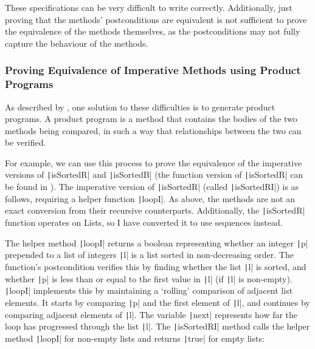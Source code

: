 These specifications can be very difficult to write correctly. Additionally, just proving that the methods' postconditions are equivalent is not sufficient to prove the equivalence of the methods themselves, as the postconditions may not fully capture the behaviour of the methods. 

\subsubsection{Proving Equivalence of Imperative Methods using Product Programs}

As described by \textcite{lahiriDifferentialAssertionChecking2013}, one solution to these difficulties is to generate product programs. A product program is a method that contains the bodies of the two methods being compared, in such a way that relationships between the two can be verified.

For example, we can use this process to prove the equivalence of the imperative versions of \texttt|isSortedR| and \texttt|isSortedB| (the function version of \texttt|isSortedR| can be found in ). The imperative version of \texttt|isSortedR| (called \texttt|isSortedRI|) is as follows, requiring a helper function \texttt|loopI|. As above, the methods are not an exact conversion from their recursive counterparts. Additionally, the \texttt|isSortedR| function operates on Lists, so I have converted it to use sequences instead. 

The helper method \texttt|loopI| returns a boolean representing whether an integer \texttt|p| prepended to a list of integers \texttt|l| is a list sorted in non-decreasing order. The function's postcondition verifies this by finding whether the list \texttt|l| is sorted, and whether \texttt|p| is less than or equal to the first value in \texttt|l| (if \texttt|l| is non-empty). \texttt|loopI| implements this by maintaining a `rolling' comparison of adjacent list elements. It starts by comparing \texttt|p| and the first element of \texttt|l|, and continues by comparing adjacent elements of \texttt|l|. The variable \texttt|next| represents how far the loop has progressed through the list \texttt|l|. The \texttt|isSortedRI| method calls the helper method \texttt|loopI| for non-empty lists and returns \texttt|true| for empty lists:


